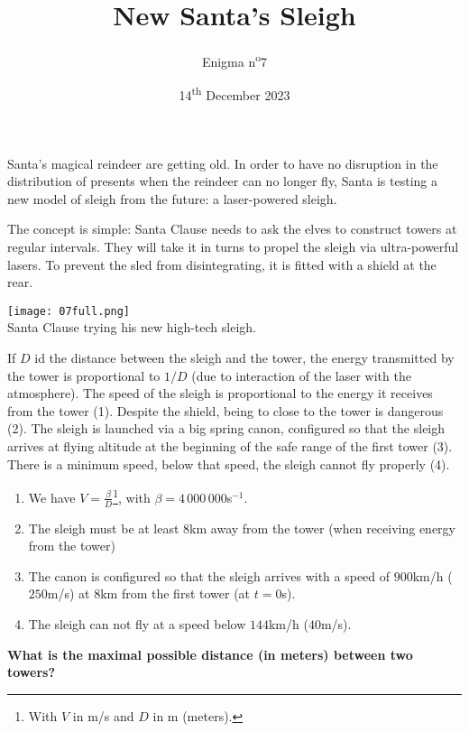 \documentclass[a4paper, top=10mm]{article}
\title{\textbf{\huge{New Santa's Sleigh}}}
\author{Enigma n\textsuperscript{o}7}
\date{14\textsuperscript{th} December 2023}
\begin{document}
	\maketitle
	
	Santa's magical reindeer are getting old.
	In order to have no disruption in the distribution of presents when the reindeer can no longer fly, Santa is testing a new model of sleigh from the future: a laser-powered sleigh.
	
	The concept is simple: Santa Clause needs to ask the elves to construct towers at regular intervals.
	They will take it in turns to propel the sleigh via ultra-powerful lasers.
	To prevent the sled from disintegrating, it is fitted with a shield at the rear.
	
	\begin{center}
		\texttt{[image: 07full.png]}\\
		Santa Clause trying his new high-tech sleigh.
	\end{center}
	
	If $D$ id the distance between the sleigh and the tower, the energy transmitted by the tower is proportional to $1/D$ (due to interaction of the laser with the atmosphere).
	The speed of the sleigh is proportional to the energy it receives from the tower (1).
	Despite the shield, being to close to the tower is dangerous (2).
	The sleigh is launched via a big spring canon, configured so that the sleigh arrives at flying altitude at the beginning of the safe range of the first tower (3).
	There is a minimum speed, below that speed, the sleigh cannot fly properly (4).
	
	\begin{enumerate}
		\item We have $V = \frac{\beta}{D}$\footnote{With $V$ in m/s and $D$ in m (meters).}, with $\beta=4\,000\,000$s$ ^{-1}$.
		\item The sleigh must be at least $8$km away from the tower (when receiving energy from the tower)
		\item The canon is configured so that the sleigh arrives with a speed of $900$km/h ($250$m/s) at $8$km from the first tower (at $t=0$s).
		\item The sleigh can not fly at a speed below $144$km/h ($40$m/s).
	\end{enumerate}
	
	\textbf{What is the maximal possible distance (in meters) between two towers?}
	
\end{document}
